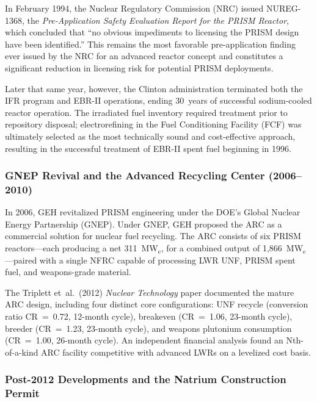 \documentclass[10pt,twoside]{article}
\begin{document}
In February 1994, the Nuclear Regulatory Commission (NRC) issued NUREG-1368,
the \textit{Pre-Application Safety Evaluation Report for the PRISM Reactor},
which concluded that ``no obvious impediments to licensing the PRISM design
have been identified.''\cite{NRC1994}  This remains the most favorable
pre-application finding ever issued by the NRC for an advanced reactor concept
and constitutes a significant reduction in licensing risk for potential
PRISM deployments.

Later that same year, however, the Clinton administration terminated both the
IFR program and EBR-II operations, ending 30~years of successful
sodium-cooled reactor operation.  The irradiated fuel inventory required
treatment prior to repository disposal; electrorefining in the Fuel
Conditioning Facility (FCF) was ultimately selected as the most technically
sound and cost-effective approach, resulting in the successful treatment of
EBR-II spent fuel beginning in 1996.\cite{Till2011}

\subsubsection{GNEP Revival and the Advanced Recycling Center (2006--2010)}

In 2006, GEH revitalized PRISM engineering under the DOE's Global Nuclear
Energy Partnership (GNEP).\cite{Triplett2012}  Under GNEP, GEH proposed the
ARC as a commercial solution for nuclear fuel recycling.  The ARC consists
of six PRISM reactors---each producing a net 311~MW$_\text{e}$, for a
combined output of 1{,}866~MW$_\text{e}$---paired with a single NFRC capable
of processing LWR UNF, PRISM spent fuel, and weapons-grade material.

The Triplett et~al.\ (2012) \textit{Nuclear Technology} paper\cite{Triplett2012}
documented the mature ARC design, including four distinct core
configurations: UNF recycle (conversion ratio CR~=~0.72, 12-month cycle),
breakeven (CR~=~1.06, 23-month cycle), breeder (CR~=~1.23, 23-month cycle),
and weapons plutonium consumption (CR~=~1.00, 26-month cycle).  An
independent financial analysis found an Nth-of-a-kind ARC facility
competitive with advanced LWRs on a levelized cost basis.\cite{Triplett2012}

\subsubsection{Post-2012 Developments and the Natrium Construction Permit}
\end{document}
